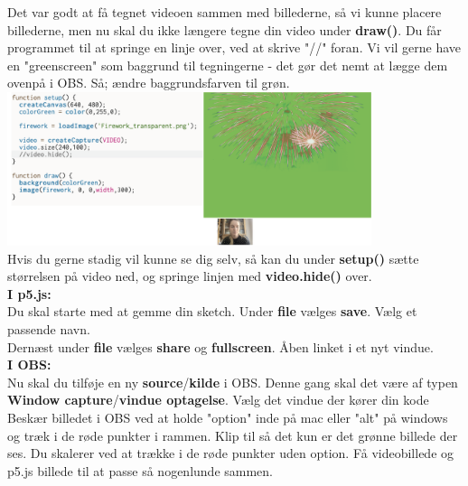\documentclass{ucph-handout}
\begin{document}
\newpage

\begin{exercisebox}[adjusted title= Klargør koden i p5.js - mac optimering]

Det var godt at få tegnet videoen sammen med billederne, så vi kunne placere billederne, men nu skal du ikke længere tegne din video under \textbf{draw()}. Du får programmet til at springe en linje over, ved at skrive "//" foran. 
Vi vil gerne have en "greenscreen" som baggrund til tegningerne - det gør det nemt at lægge dem ovenpå i OBS. Så; ændre baggrundsfarven til grøn.\\

\includegraphics[width=0.8\textwidth]{nyebilleder/samleteksemple.png}\\

Hvis du gerne stadig vil kunne se dig selv, så kan du under \textbf{setup()} sætte størrelsen på video ned, og springe linjen med \textbf{video.hide()} over. \\


\textbf{I p5.js:}\\
Du skal starte med at gemme din sketch. Under \textbf{file} vælges \textbf{save}. Vælg et passende navn. \\
Dernæst under \textbf{file} vælges \textbf{share} og \textbf{fullscreen}. Åben linket i et nyt vindue.  \\


\textbf{I OBS:}\\
Nu skal du tilføje en ny \textbf{source}/\textbf{kilde} i OBS. Denne gang skal det være af typen \textbf{Window capture}/\textbf{vindue optagelse}. Vælg det vindue der kører din kode\\

Beskær billedet i OBS ved at holde "option" inde på mac eller "alt" på windows og træk i de røde punkter i rammen. Klip til så det kun er det grønne billede der ses. Du skalerer ved at trække i de røde punkter uden option. Få videobillede og p5.js billede til at passe så nogenlunde sammen.   \\


\end{exercisebox}
\end{document}
